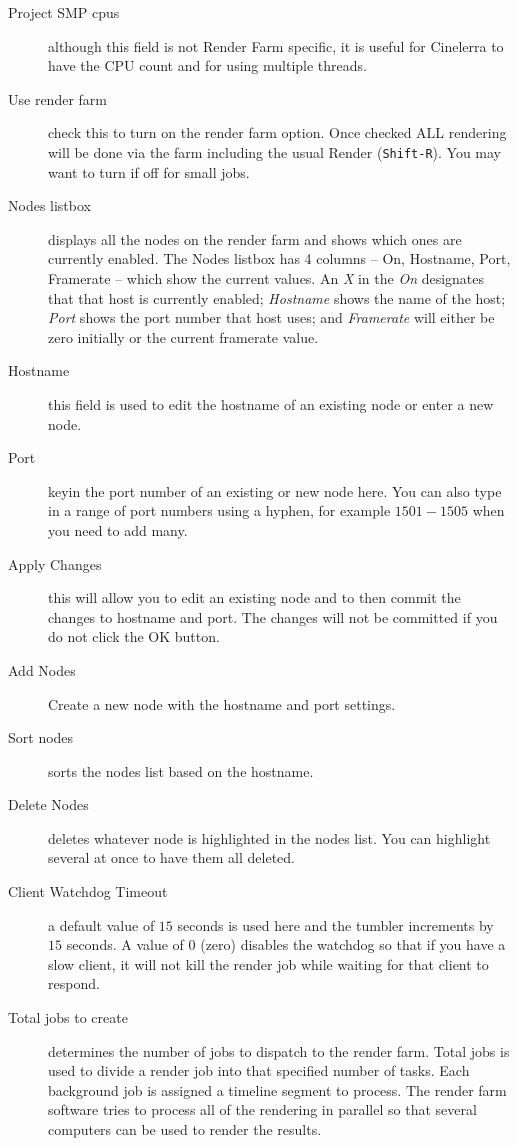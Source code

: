 \begin{description}
    \item[Project SMP cpus] although this field is not Render Farm specific, it is useful for Cinelerra to have the CPU count and for using multiple threads.
    \item[Use render farm] check this to turn on the render farm option.  Once checked ALL rendering will be done via the farm including the usual Render (\texttt{Shift-R}).  You may want to turn if off for small jobs.
    \item[Nodes listbox] displays all the nodes on the render farm and shows which ones are currently enabled. The Nodes listbox has 4 columns -- On,  Hostname,  Port,  Framerate -- which show the current values.  An \textit{X} in the \textit{On} designates that that host is currently enabled; \textit{Hostname} shows the name of the host; \textit{Port} shows the port number that host uses; and \textit{Framerate} will either be zero initially or the current framerate value.
    \item[Hostname] this field is used to edit the hostname of an existing node or enter a new node.
    \item[Port] keyin the port number of an existing or new node here.  You can also type in a range of port numbers using a hyphen, for example $1501-1505$ when you need to add many.
    \item[Apply Changes] this will allow you to edit an existing node and to then commit the changes to hostname and port. The changes will not be committed if you do not click the OK button.
    \item[Add Nodes] Create a new node with the hostname and port settings.
    \item[Sort nodes] sorts the nodes list based on the hostname.
    \item[Delete Nodes] deletes whatever node is highlighted in the nodes list.  You can highlight several at once to have them all deleted.
    \item[Client Watchdog Timeout] a default value of $15$ seconds is used here and the tumbler increments by $15$ seconds.  A value of $0$ (zero) disables the watchdog so that if you have a slow client, it will not kill the render job while waiting for that client to respond.
    \item[Total jobs to create] determines the number of jobs to dispatch to the render farm.  Total jobs is used to divide a render job into that specified number of tasks.  Each background job is assigned a timeline segment to process.  The render farm software tries to process all of the rendering in parallel so that several computers can be used to render the results.  
    

\end{description}
